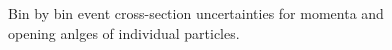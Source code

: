 \documentclass{article}
\begin{document}
\begin{figure}
    \caption{Bin by bin event cross-section uncertainties for momenta and opening anlges of individual particles.}
    \label{fig:bin-uncertainties-xsec-vector}
\end{figure}
\end{document}

